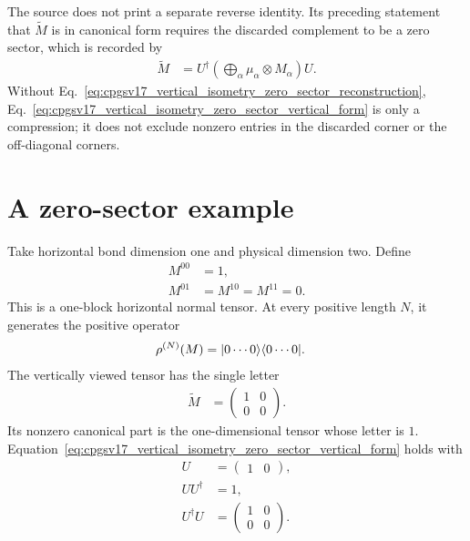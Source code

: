 \documentclass{article}
\begin{document}
The source does not print a separate reverse identity. Its preceding statement
that $\widetilde M$ is in canonical form requires the discarded complement to
be a zero sector, which is recorded by
\begin{align}
    \widetilde M
        &=
        U^\dagger
        \left(\bigoplus_\alpha\mu_\alpha\otimes M_\alpha\right)U.
    \label{eq:cpgsv17_vertical_isometry_zero_sector_reconstruction}
\end{align}
Without
Eq.~\ref{eq:cpgsv17_vertical_isometry_zero_sector_reconstruction},
Eq.~\ref{eq:cpgsv17_vertical_isometry_zero_sector_vertical_form} is only a
compression; it does not exclude nonzero entries in the discarded corner or
the off-diagonal corners.

\section{A zero-sector example}

Take horizontal bond dimension one and physical dimension two. Define
\begin{align}
    M^{00}
        &=1,
    \label{eq:cpgsv17_vertical_isometry_zero_sector_rank_one_nonzero_entry}\\
    M^{01}
        &=M^{10}
        =M^{11}
        =0.
    \label{eq:cpgsv17_vertical_isometry_zero_sector_rank_one_zero_entries}
\end{align}
This is a one-block horizontal normal tensor. At every positive length $N$, it
generates the positive operator
\begin{align}
    \rho^{(N)}(M)
        &=
        |0\cdots0\rangle\langle 0\cdots0|.
    \label{eq:cpgsv17_vertical_isometry_zero_sector_rank_one_operator}
\end{align}
The vertically viewed tensor has the single letter
\begin{align}
    \widetilde M
        &=
        \begin{pmatrix}
            1&0\\
            0&0
        \end{pmatrix}.
    \label{eq:cpgsv17_vertical_isometry_zero_sector_vertical_letter}
\end{align}
Its nonzero canonical part is the one-dimensional tensor whose letter is $1$.
Equation~\ref{eq:cpgsv17_vertical_isometry_zero_sector_vertical_form} holds
with
\begin{align}
    U
        &=
        \begin{pmatrix}
            1&0
        \end{pmatrix},
    \label{eq:cpgsv17_vertical_isometry_zero_sector_example_map}\\
    UU^\dagger
        &=1,
    \label{eq:cpgsv17_vertical_isometry_zero_sector_example_coisometry}\\
    U^\dagger U
        &=
        \begin{pmatrix}
            1&0\\
            0&0
        \end{pmatrix}.
    \label{eq:cpgsv17_vertical_isometry_zero_sector_example_support}
\end{align}
\end{document}
